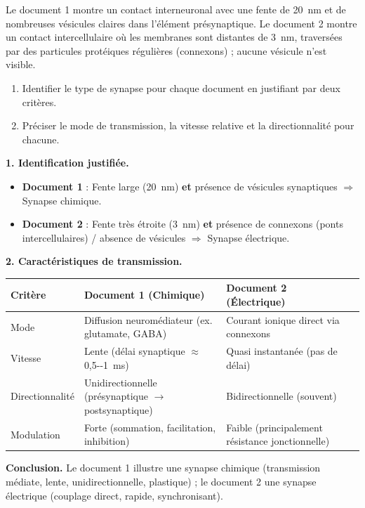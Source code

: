 \documentclass[11pt]{article}
\newcommand{\cle}[1]{{\popxbold\color{popdark}#1}}
\begin{document}
\begin{exoresolu}
Le document 1 montre un contact interneuronal avec une fente de \SI{20}{nm} et de nombreuses vésicules claires dans l'élément présynaptique. Le document 2 montre un contact intercellulaire où les membranes sont distantes de \SI{3}{nm}, traversées par des particules protéiques régulières (connexons) ; aucune vésicule n'est visible.
\begin{enumerate}
\item Identifier le type de synapse pour chaque document en justifiant par deux critères.
\item Préciser le mode de transmission, la vitesse relative et la directionnalité pour chacune.
\end{enumerate}
\tcblower
\textbf{1. Identification justifiée.}
\begin{itemize}
\item \textbf{Document 1} : Fente large (\SI{20}{nm}) \textbf{et} présence de vésicules synaptiques $\Rightarrow$ \cle{Synapse chimique}.
\item \textbf{Document 2} : Fente très étroite (\SI{3}{nm}) \textbf{et} présence de connexons (ponts intercellulaires) / absence de vésicules $\Rightarrow$ \cle{Synapse électrique}.
\end{itemize}
\textbf{2. Caractéristiques de transmission.}
\begin{center}
\begin{tabularx}{\linewidth}{|l|X|X|X|}\hline
\rowcolor{popblueL}
\textbf{Critère} & \textbf{Document 1 (Chimique)} & \textbf{Document 2 (Électrique)} \\ \hline
Mode & Diffusion neuromédiateur (ex. glutamate, GABA) & Courant ionique direct via connexons \\ \hline
Vitesse & Lente (délai synaptique $\approx$ \SI{0,5--1}{ms}) & Quasi instantanée (pas de délai) \\ \hline
Directionnalité & Unidirectionnelle (présynaptique $\rightarrow$ postsynaptique) & Bidirectionnelle (souvent) \\ \hline
Modulation & Forte (sommation, facilitation, inhibition) & Faible (principalement résistance jonctionnelle) \\ \hline
\end{tabularx}
\end{center}
\textbf{Conclusion.} Le document 1 illustre une synapse chimique (transmission médiate, lente, unidirectionnelle, plastique) ; le document 2 une synapse électrique (couplage direct, rapide, synchronisant).
\end{exoresolu}
\end{document}
